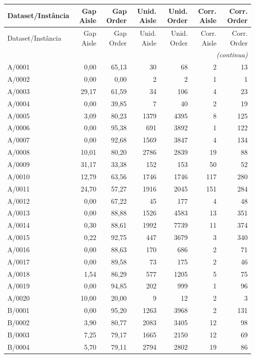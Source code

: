 \small
\begin{longtable}{lrrrrrr}
\toprule
Dataset/Instância & Gap Aisle & Gap Order & Unid. Aisle & Unid. Order & Corr. Aisle & Corr. Order \\
\midrule
\endfirsthead
\toprule
Dataset/Instância & Gap Aisle & Gap Order & Unid. Aisle & Unid. Order & Corr. Aisle & Corr. Order \\
\midrule
\endhead
\midrule
\multicolumn{7}{r}{\textit{(continua)}} \\
\endfoot
\bottomrule
\endlastfoot
A/0001 & 0,00 & 65,13 & 30 & 68 & 2 & 13 \\
A/0002 & 0,00 & 0,00 & 2 & 2 & 1 & 1 \\
A/0003 & 29,17 & 61,59 & 34 & 106 & 4 & 23 \\
A/0004 & 0,00 & 39,85 & 7 & 40 & 2 & 19 \\
A/0005 & 3,09 & 80,23 & 1379 & 4395 & 8 & 125 \\
A/0006 & 0,00 & 95,38 & 691 & 3892 & 1 & 122 \\
A/0007 & 0,00 & 92,68 & 1569 & 3847 & 4 & 134 \\
A/0008 & 10,01 & 80,20 & 2786 & 2839 & 19 & 88 \\
A/0009 & 31,17 & 33,38 & 152 & 153 & 50 & 52 \\
A/0010 & 12,79 & 63,56 & 1746 & 1746 & 117 & 280 \\
A/0011 & 24,70 & 57,27 & 1916 & 2045 & 151 & 284 \\
A/0012 & 0,00 & 67,22 & 45 & 177 & 4 & 48 \\
A/0013 & 0,00 & 88,88 & 1526 & 4583 & 13 & 351 \\
A/0014 & 0,30 & 88,61 & 1992 & 7739 & 11 & 374 \\
A/0015 & 0,22 & 92,75 & 447 & 3679 & 3 & 340 \\
A/0016 & 0,00 & 88,63 & 170 & 686 & 2 & 71 \\
A/0017 & 0,00 & 89,58 & 73 & 175 & 2 & 46 \\
A/0018 & 1,54 & 86,29 & 577 & 1205 & 5 & 75 \\
A/0019 & 0,00 & 94,85 & 202 & 999 & 1 & 96 \\
A/0020 & 10,00 & 20,00 & 9 & 12 & 2 & 3 \\
B/0001 & 0,00 & 95,20 & 1263 & 3968 & 2 & 131 \\
B/0002 & 3,90 & 80,77 & 2083 & 3405 & 12 & 98 \\
B/0003 & 7,25 & 79,17 & 1665 & 2150 & 12 & 69 \\
B/0004 & 5,70 & 79,11 & 2794 & 2802 & 19 & 86 \\

\end{longtable}
